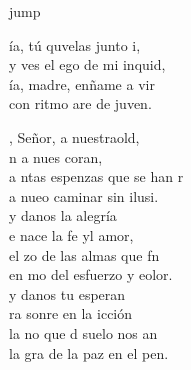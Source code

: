 \begin{cancion}jump\\
	\begin{chorus}%
		ía, tú quvelas junto i,\\
		y ves el ego de mi inquid,\\
		ía, madre, enñame a vir\\
		con ritmo are de juven.\jump\\
	\end{chorus}%
	, Señor, a nuestraold,\\
	n a nues coran,\\
	a ntas espenzas que se han r \\
	a nueo caminar sin ilusi.\\
	\jump
	 y danos la alegría  \\
	e nace la fe yl amor,\\
	el zo de las almas que fn\\
	en mo del esfuerzo y eolor.\\
	\jump
	 y danos tu esperan   \\
	ra sonre en la icción\\
	la no que d suelo nos an \\
	la gra de la paz en el pen.\\
	\jump
\end{cancion}%
